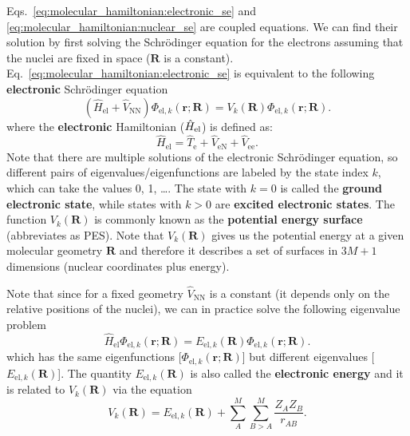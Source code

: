 \documentclass[../Main/chem532-notes.tex]{subfiles}
\begin{document}
Eqs.~\eqref{eq:molecular_hamiltonian:electronic_se} and \eqref{eq:molecular_hamiltonian:nuclear_se} are coupled equations.
We can find their solution by first solving the Schr\"{o}dinger equation for the electrons assuming that the nuclei are fixed in space ($\mathbf{R}$ is a constant).
Eq.~\eqref{eq:molecular_hamiltonian:electronic_se} is equivalent to the following \textbf{electronic} Schr\"{o}dinger equation
\begin{equation}
\label{eq:molecular_hamiltonian:electronic_se2}
(\hat{H}_\mathrm{el} + \hat{V}_\mathrm{NN})\Phi_{\mathrm{el},k}(\mathbf{r};\mathbf{R})
= V_{k}(\mathbf{R}) \Phi_{\mathrm{el},k}(\mathbf{r};\mathbf{R}).
\end{equation}
where the \textbf{electronic} Hamiltonian ($\hat{H}_{\rm el}$) is defined as:
\begin{equation}
\hat{H}_\mathrm{el} = \hat{T}_\mathrm{e} + \hat{V}_\mathrm{eN} + \hat{V}_\mathrm{ee}.
\end{equation}
Note that there are multiple solutions of the electronic Schr\"{o}dinger equation, so different pairs of eigenvalues/eigenfunctions are labeled by the state index $k$, which can take the values 0, 1, \ldots. The state with $k = 0$  is called the \textbf{ground electronic state}, while states with $k > 0$ are \textbf{excited electronic states}.
The function $V_{k}(\mathbf{R})$ is commonly known as the \textbf{potential energy surface} (abbreviates as PES).
Note that $V_{k}(\mathbf{R})$ gives us the potential energy at a given molecular geometry $\mathbf{R}$ and therefore it describes a set of surfaces in $3M + 1$ dimensions (nuclear coordinates plus energy).

Note that since for a fixed geometry $\hat{V}_\mathrm{NN}$ is a constant (it depends only on the relative positions of the nuclei), we can in practice solve the following eigenvalue problem
\begin{equation}
\label{eq:molecular_hamiltonian:electronic_se3}
\hat{H}_\mathrm{el}\Phi_{\mathrm{el},k}(\mathbf{r};\mathbf{R})
= E_{\mathrm{el}, k}(\mathbf{R}) \Phi_{\mathrm{el},k}(\mathbf{r};\mathbf{R}).
\end{equation}
which has the same eigenfunctions [$\Phi_{\mathrm{el},k}(\mathbf{r};\mathbf{R})$] but different eigenvalues [$E_{\mathrm{el}, k}(\mathbf{R})$].
The quantity $E_{\mathrm{el}, k}(\mathbf{R})$ is also called the \textbf{electronic energy} and it is related to $V_{k}(\mathbf{R})$ via the equation
\begin{equation}
V_{k}(\mathbf{R}) = E_{\mathrm{el},k}(\mathbf{R}) + \sum_{A}^{M} \sum_{B > A}^{M} \frac{Z_A Z_B}{r_{AB}}.
\end{equation}
\end{document}
